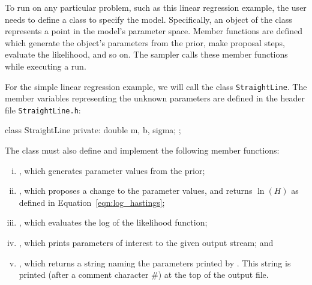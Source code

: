 \documentclass[article]{jss}
\begin{document}
To run  on any particular problem, such as this linear regression
example, the user needs to define a  class to specify the
model. Specifically, an object of the class represents a point in the
model's parameter space. Member functions are defined which generate
the object's parameters from the prior, make proposal steps, evaluate the
likelihood, and so on. The sampler calls these member functions while
executing a run.

For the simple linear regression example, we will call the class
{\tt StraightLine}. The member variables representing the
unknown parameters are defined in the header file {\tt StraightLine.h}:

\begin{CodeChunk}
\begin{CodeInput}
class StraightLine
{
    private:
        double m, b, sigma;
};
\end{CodeInput}
\end{CodeChunk}

The class must also define and implement the following member functions:
\begin{enumerate}[(i)]
\item {}, which generates parameter
        values from the prior;
\item {}, which proposes a
        change to the parameter values, and returns $\ln(H)$ as defined in
        Equation~\ref{eqn:log_hastings};
\item {}, which evaluates the log of
        the likelihood function;
\item {}, which prints parameters of
        interest to the given output stream; and
\item {}, which returns a 
        string naming the parameters printed by .
        This string is printed (after a comment character \#) at the top of
        the output file.
\end{enumerate}


\end{document}
